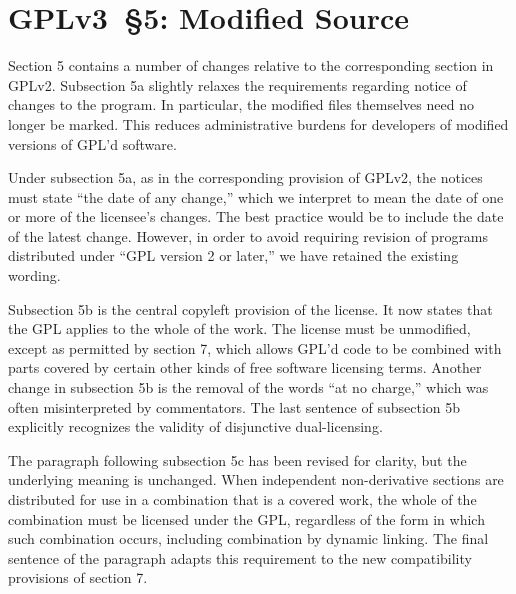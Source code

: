 \section{GPLv3~\S5: Modified Source}


Section 5 contains a number of changes relative to the corresponding section
in GPLv2. Subsection 5a slightly relaxes the requirements regarding notice of
changes to the program. In particular, the modified files themselves need no
longer be marked. This reduces administrative burdens for developers of
modified versions of GPL'd software.

Under subsection 5a, as in the corresponding provision of GPLv2, the notices
must state ``the date of any change,'' which we interpret to mean the date of
one or more of the licensee's changes.  The best practice would be to include
the date of the latest change.  However, in order to avoid requiring revision
of programs distributed under ``GPL version 2 or later,'' we have retained
the existing wording.


Subsection 5b is the central copyleft provision of the license.  It now
states that the GPL applies to the whole of the work.  The license must be
unmodified, except as permitted by section 7, which allows GPL'd code to be
combined with parts covered by certain other kinds of free software licensing
terms. Another change in subsection 5b is the removal of the words ``at no
charge,'' which was often misinterpreted by commentators.  The last sentence
of subsection 5b explicitly recognizes the validity of disjunctive
dual-licensing.




The paragraph following subsection 5c has been revised for clarity, but the
underlying meaning is unchanged. When independent non-derivative sections are
distributed for use in a combination that is a covered work, the whole of the
combination must be licensed under the GPL, regardless of the form in which
such combination occurs, including combination by dynamic linking. The final
sentence of the paragraph adapts this requirement to the new compatibility
provisions of section 7.

